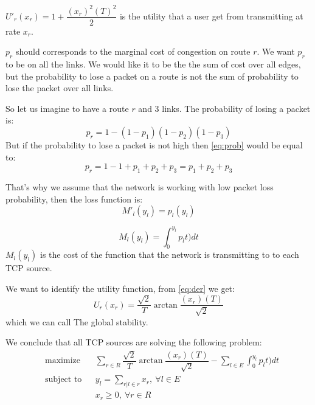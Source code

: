 $U'_r(x_r)=1+\dfrac{(x_r)^2(T)^2}{2}$ is the utility that a user get from transmitting at rate $x_r$.

$p_r$ should corresponds to the marginal cost of congestion on route $r$.
We want $p_r$ to be on all the links. We would like it to be the the sum of cost over all edges, but  the probability to lose a packet on a route is not the sum of probability to lose the packet over all links.

So let us imagine to have a route $r$ and 3 links. The probability of losing a packet is:
\begin{equation}
\label{eq:prob}
p_r=1-(1-p_1)(1-p_2)(1-p_3)
\end{equation}
But if the probability to lose a packet is not high then \eqref{eq:prob} would be equal to:
\begin{equation}
p_r=1-1+p_1+p_2+p_3=p_1+p_2+p_3
\end{equation}

That's why we assume that the network is working with low packet loss probability, then the loss function is:
\begin{equation}
M'_l(y_l)=p_l(y_l)
\end{equation}

\begin{equation}
M_l(y_l)=\int_{0}^{y_l} p_lt) dt
\end{equation}
$M_l(y_l)$ is the cost of the function that the network is transmitting to to each TCP source.

We want to identify the utility function, from \eqref{eq:der} we get:
\begin{equation}
U_r(x_r)=\dfrac{\sqrt{2}}{T}\arctan \dfrac{(x_r)(T)}{\sqrt{2}}
\end{equation}
which we can call The global stability.


We conclude that all TCP sources are solving the following problem:
\begin{equation}
\begin{aligned}
& {\text{maximize}}
& &  \sum_{r \in R} \dfrac{\sqrt{2}}{T}\arctan \dfrac{(x_r)(T)}{\sqrt{2}}- \sum_{l \in E} \int_{0}^{y_l} p_lt) dt\\
& \text{subject to}
& & y_{l} = \sum\limits_{r|l \in r} x_{r},\ \forall l \in E\\
&      &&  x_{r} \geq 0,\ \forall r \in R\\
\end{aligned}
\end{equation}

